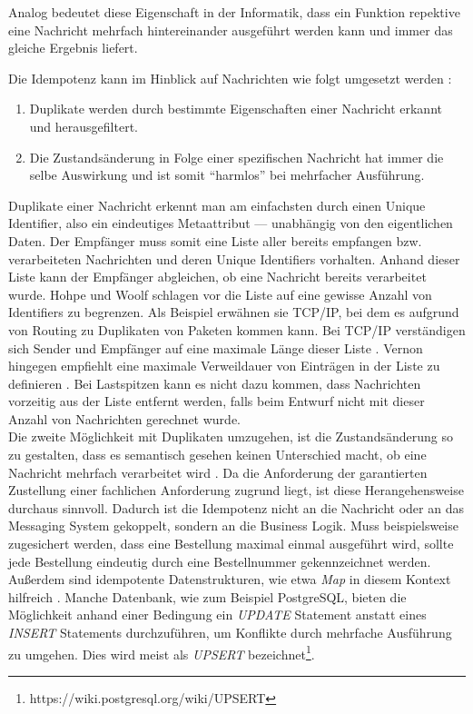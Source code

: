 Analog bedeutet diese Eigenschaft in der Informatik, dass ein Funktion repektive eine Nachricht mehrfach hintereinander ausgeführt werden kann und immer das gleiche Ergebnis liefert.\\

\pagebreak

Die Idempotenz kann im Hinblick auf Nachrichten wie folgt umgesetzt werden \cite[S.~383]{vernon_reactive_2016} \cite[S.~529]{hohpe_enterprise_2004}:

\begin{enumerate}
\item Duplikate werden durch bestimmte Eigenschaften einer Nachricht erkannt und herausgefiltert.
\item Die Zustandsänderung in Folge einer spezifischen Nachricht hat immer die selbe Auswirkung und ist somit \enquote{harmlos} bei mehrfacher Ausführung.
\end{enumerate}

Duplikate einer Nachricht erkennt man am einfachsten durch einen Unique Identifier, also ein eindeutiges Metaattribut --- unabhängig von den eigentlichen Daten. Der Empfänger muss somit eine Liste aller bereits empfangen bzw. verarbeiteten Nachrichten und deren Unique Identifiers vorhalten. Anhand dieser Liste kann der Empfänger abgleichen, ob eine Nachricht bereits verarbeitet wurde. Hohpe und Woolf schlagen vor die Liste auf eine gewisse Anzahl von Identifiers zu begrenzen. Als Beispiel erwähnen sie TCP/IP, bei dem es aufgrund von Routing zu Duplikaten von Paketen kommen kann. Bei TCP/IP verständigen sich Sender und Empfänger auf eine maximale Länge dieser Liste \cite[S.~530]{hohpe_enterprise_2004}. Vernon hingegen empfiehlt eine maximale Verweildauer von Einträgen in der Liste zu definieren \cite[S.~383]{vernon_reactive_2016}. Bei Lastspitzen kann es nicht dazu kommen, dass Nachrichten vorzeitig aus der Liste entfernt werden, falls beim Entwurf nicht mit dieser Anzahl von Nachrichten gerechnet wurde.\\

Die zweite Möglichkeit mit Duplikaten umzugehen, ist die Zustandsänderung so zu gestalten, dass es semantisch gesehen keinen Unterschied macht, ob eine Nachricht mehrfach verarbeitet wird \cite[S.~530]{hohpe_enterprise_2004}. Da die Anforderung der garantierten Zustellung einer fachlichen Anforderung zugrund liegt, ist diese Herangehensweise durchaus sinnvoll. Dadurch ist die Idempotenz nicht an die Nachricht oder an das Messaging System gekoppelt, sondern an die Business Logik. Muss beispielsweise zugesichert werden, dass eine Bestellung maximal einmal ausgeführt wird, sollte jede Bestellung eindeutig durch eine Bestellnummer gekennzeichnet werden. Außerdem sind idempotente Datenstrukturen, wie etwa \textit{Map} in diesem Kontext hilfreich \cite[S.~386]{vernon_reactive_2016}. Manche Datenbank, wie zum Beispiel PostgreSQL, bieten die Möglichkeit anhand einer Bedingung ein \textit{UPDATE} Statement anstatt eines \textit{INSERT} Statements durchzuführen, um Konflikte durch mehrfache Ausführung zu umgehen. Dies wird meist als \textit{UPSERT} bezeichnet\footnote{https://wiki.postgresql.org/wiki/UPSERT}.\\

